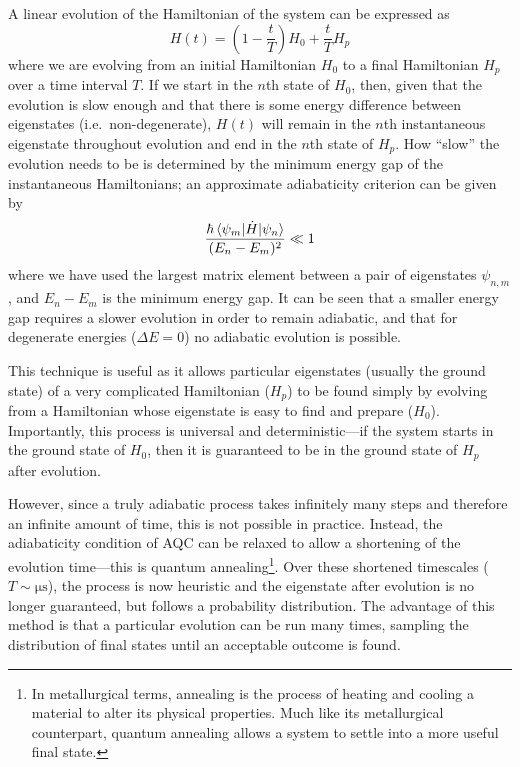 \documentclass[12pt]{article}
\theoremstyle{definition}
\begin{document}
A linear evolution of the Hamiltonian of the system can be expressed as
\begin{equation}
    H(t)=\left(1- \frac{t}{T}\right)H_0 + \frac{t}{T}H_p
    \label{eq:time-evolution}
\end{equation}
where we are evolving from an initial Hamiltonian $H_0$ to a final Hamiltonian $H_p$ over a time interval $T$. If we start in the $n$th state of $H_0$, then, given that the evolution is slow enough and that there is some energy difference between eigenstates (i.e.\ non-degenerate), $H(t)$ will remain in the $n$th instantaneous eigenstate throughout evolution and end in the $n$th state of $H_p$. How ``slow'' the evolution needs to be is determined by the minimum energy gap of the instantaneous Hamiltonians; an approximate adiabaticity criterion can be given by
\begin{equation}
    \frac{\hbar\braket{\psi_m|\dot{H}|\psi_n}}{(E_n-E_m)^2} \ll 1
    \label{eq:energy-gap}
\end{equation}
where we have used the largest matrix element between a pair of eigenstates $\psi_{n,m}$, and ${E_n-E_m}$ is the minimum energy gap. It can be seen that a smaller energy gap requires a slower evolution in order to remain adiabatic, and that for degenerate energies ($\Delta E=0$) no adiabatic evolution is possible. 

This technique is useful as it allows particular eigenstates (usually the ground state) of a very complicated Hamiltonian ($H_p$) to be found simply by evolving from a Hamiltonian whose eigenstate is easy to find and prepare ($H_0$). Importantly, this process is universal and deterministic---if the system starts in the ground state of $H_0$, then it is guaranteed to be in the ground state of $H_p$ after evolution.

However, since a truly adiabatic process takes infinitely many steps and therefore an infinite amount of time, this is not possible in practice. Instead, the adiabaticity condition of AQC can be relaxed to allow a shortening of the evolution time---this is quantum annealing\footnote{In metallurgical terms, annealing is the process of heating and cooling a material to alter its physical properties. Much like its metallurgical counterpart, quantum annealing allows a system to settle into a more useful final state.}. Over these shortened timescales ($T\sim\unit{\us}$), the process is now heuristic and the eigenstate after evolution is no longer guaranteed, but follows a probability distribution. The advantage of this method is that a particular evolution can be run many times, sampling the distribution of final states until an acceptable outcome is found.
\end{document}
